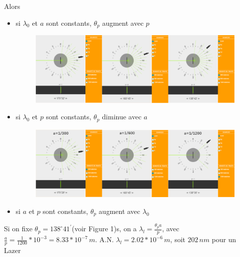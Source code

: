 \documentclass[a4paper,12pt]{book}
\begin{document}
Alors 
\begin{itemize}
    \item si $\lambda_0$ et $a$ sont constants, $\theta_p$ augment avec $p$
    \begin{figure}[h]
        \begin{center}
        \includegraphics[scale=0.5]{tr132.png}
        \end{center}
    \end{figure}
    \item si $\lambda_0$ et $p$ sont constants, $\theta_p$ diminue avec $a$ 
    \begin{figure}[h]
        \begin{center}
        \includegraphics[scale=0.5]{tr133.png}
        \end{center}
    \end{figure}   
    
    
    \item si $a$ et $p$ sont constants, $\theta_p$ augment avec $\lambda_0$
\end{itemize}
Si on fixe $\theta_p=138^\circ41^{'}$(voir Figure 1)s, on a $\boxed{\lambda_l=\frac{\theta_pa}{p}}$, avec $\frac{a}{p}=\frac{1}{1200}*10^{-3}=8.33*10^{-7}\,m$. 
A.N. $\boxed{\lambda_l=2.02*10^{-6}\,m}$, soit $202\,nm$ pour un Lazer
\end{document}
